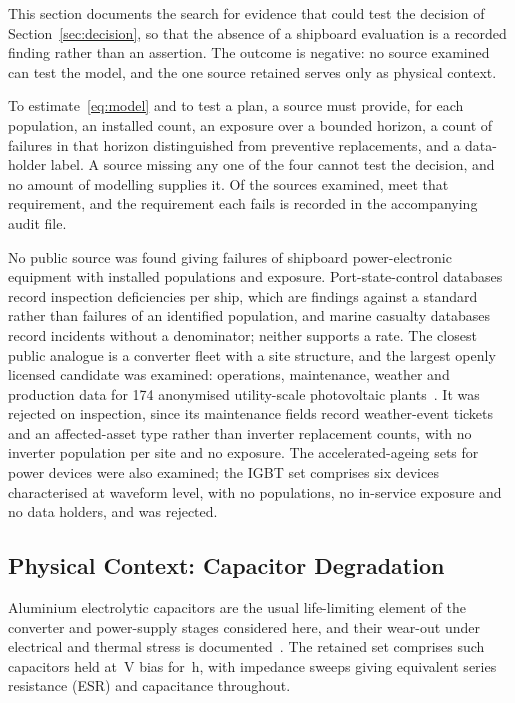 This section documents the search for evidence that could test the decision of
Section~\ref{sec:decision}, so that the absence of a shipboard evaluation is a
recorded finding rather than an assertion. The outcome is negative: no source
examined can test the model, and the one source retained serves only as physical
context.

To estimate~\eqref{eq:model} and to test a plan, a source must provide, for each
population, an installed count, an exposure over a bounded horizon, a count of
failures in that horizon distinguished from preventive replacements, and a
data-holder label. A source missing any one of the four cannot test the decision,
and no amount of modelling supplies it. Of the \nSources{} sources examined,
\nSuitable{} meet that requirement, and the requirement each fails is recorded in
the accompanying audit file.



No public source was found giving failures of shipboard power-electronic equipment
with installed populations and exposure. Port-state-control databases record
inspection deficiencies per ship, which are findings against a standard rather
than failures of an identified population, and marine casualty databases record
incidents without a denominator; neither supports a rate. The closest public
analogue is a converter fleet with a site structure, and the largest openly
licensed candidate was examined: operations, maintenance, weather and production
data for 174 anonymised utility-scale photovoltaic plants~\cite{oedi_pv}. It was
rejected on inspection, since its maintenance fields record weather-event tickets
and an affected-asset type rather than inverter replacement counts, with no
inverter population per site and no exposure. The accelerated-ageing sets for
power devices were also examined; the IGBT set comprises six devices characterised
at waveform level, with no populations, no in-service exposure and no data
holders, and was rejected.

\subsection{Physical Context: Capacitor Degradation}
Aluminium electrolytic capacitors are the usual life-limiting element of the
converter and power-supply stages considered here, and their wear-out under
electrical and thermal stress is documented~\cite{celaya2012,kulkarni2012}.
The retained set comprises \capUnits{} such capacitors held at
\capLevels\,V bias for \capHours\,h, with impedance sweeps giving equivalent
series resistance (ESR) and capacitance throughout.

